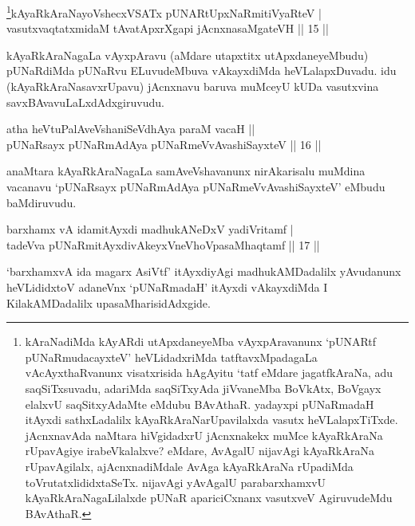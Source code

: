 

\begin{shl}
\footnote{kAraNadiMda kAyARdi utApxdaneyeMba vAyxpAravanunx `pUNARtf pUNaRmudacayxteV' heVLidadxriMda tatftavxMpadagaLa vAcAyxthaRvanunx visatxrisida hAgAyitu `tatf eMdare jagatfkAraNa, adu saqSiTxsuvadu, adariMda saqSiTxyAda jiVvaneMba BoVkAtx, BoVgayx elalxvU saqSitxyAdaMte eMdubu BAvAthaR. yadayxpi pUNaRmadaH itAyxdi sathxLadalilx kAyaRkAraNarUpavilalxda vasutx heVLalapxTiTxde. jAcnxnavAda naMtara hiVgidadxrU jAcnxnakekx muMce kAyaRkAraNa rUpavAgiye irabeVkalalxve? eMdare, AvAgalU nijavAgi kAyaRkAraNa rUpavAgilalx, ajAcnxnadiMdale AvAga kAyaRkAraNa rUpadiMda toVrutatxlididxtaSeTx. nijavAgi yAvAgalU parabarxhamxvU kAyaRkAraNagaLilalxde pUNaR apariciCxnanx vasutxveV AgiruvudeMdu BAvAthaR.}kAyaRkAraNayoVshecxVSATx pUNARtUpxNaRmitiVyaRteV  | \\
vasutxvaqtatxmidaM tAvatApxrXgapi jAcnxnasaMgateVH \hfill ||  15 ||  
\end{shl}

\begin{artha}
kAyaRkAraNagaLa vAyxpAravu (aMdare utapxtitx utApxdaneyeMbudu) pUNaRdiMda pUNaRvu ELuvudeMbuva vAkayxdiMda heVLalapxDuvadu. idu (kAyaRkAraNasavxrUpavu) jAcnxnavu baruva muMceyU kUDa vasutxvina savxBAvavuLaLxdAdxgiruvudu.
\end{artha}


\begin{shl}
atha heVtuPalAveVshaniSeVdhAya paraM vacaH ||  \\
pUNaRsayx pUNaRmAdAya pUNaRmeVvAvashiSayxteV \hfill||  16 ||  
\end{shl}

\begin{artha}
anaMtara kAyaRkAraNagaLa samAveVshavanunx nirAkarisalu muMdina vacanavu `pUNaRsayx pUNaRmAdAya pUNaRmeVvAvashiSayxteV' eMbudu baMdiruvudu.
\end{artha}

\begin{shl}
barxhamx vA idamitAyxdi madhukANeDxV yadiVritamf  | \\
tadeVva pUNaRmitAyxdivAkeyxVneVhoVpasaMhaqtamf \hfill ||  17 ||  
\end{shl}

\begin{artha}
`barxhamxvA ida magarx AsiVtf' itAyxdiyAgi madhukAMDadalilx yAvudanunx heVLididxtoV adaneVnx `pUNaRmadaH' itAyxdi vAkayxdiMda I KilakAMDadalilx upasaMharisidAdxgide.
\end{artha}


